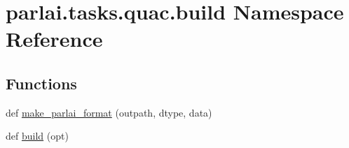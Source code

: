 \hypertarget{namespaceparlai_1_1tasks_1_1quac_1_1build}{}\section{parlai.\+tasks.\+quac.\+build Namespace Reference}
\label{namespaceparlai_1_1tasks_1_1quac_1_1build}
\subsection*{Functions}
\begin{DoxyCompactItemize}
\item 
def \hyperlink{namespaceparlai_1_1tasks_1_1quac_1_1build_a08c212462b5c58cde91192d35f24f0cc}{make\+\_\+parlai\+\_\+format} (outpath, dtype, data)
\item 
def \hyperlink{namespaceparlai_1_1tasks_1_1quac_1_1build_a86e9b7d4a167a4dc22e925770ce42824}{build} (opt)
\end{DoxyCompactItemize}

